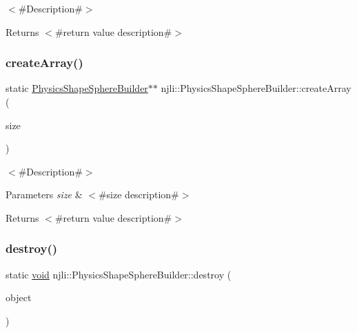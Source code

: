 $<$\#\+Description\#$>$

\begin{DoxyReturn}{Returns}
$<$\#return value description\#$>$ 
\end{DoxyReturn}
\mbox{\label{classnjli_1_1_physics_shape_sphere_builder_acd366ec74bb20ca7237733023457834f}} 
\subsubsection{\texorpdfstring{create\+Array()}{createArray()}}
{\footnotesize\ttfamily static \mbox{\hyperlink{classnjli_1_1_physics_shape_sphere_builder}{Physics\+Shape\+Sphere\+Builder}}$\ast$$\ast$ njli\+::\+Physics\+Shape\+Sphere\+Builder\+::create\+Array (\begin{DoxyParamCaption}\item[{const \mbox{\hyperlink{_util_8h_a10e94b422ef0c20dcdec20d31a1f5049}{u32}}}]{size }\end{DoxyParamCaption})\hspace{0.3cm}{\ttfamily [static]}}

$<$\#\+Description\#$>$


\begin{DoxyParams}{Parameters}
{\em size} & $<$\#size description\#$>$\\
\hline
\end{DoxyParams}
\begin{DoxyReturn}{Returns}
$<$\#return value description\#$>$ 
\end{DoxyReturn}
\mbox{\label{classnjli_1_1_physics_shape_sphere_builder_a24e892e3dba8edb73be8c4bf21c8a655}} 
\subsubsection{\texorpdfstring{destroy()}{destroy()}}
{\footnotesize\ttfamily static \mbox{\hyperlink{_thread_8h_af1e856da2e658414cb2456cb6f7ebc66}{void}} njli\+::\+Physics\+Shape\+Sphere\+Builder\+::destroy (\begin{DoxyParamCaption}\item[{\mbox{\hyperlink{classnjli_1_1_physics_shape_sphere_builder}{Physics\+Shape\+Sphere\+Builder}} $\ast$}]{object }\end{DoxyParamCaption})\hspace{0.3cm}{\ttfamily [static]}}

